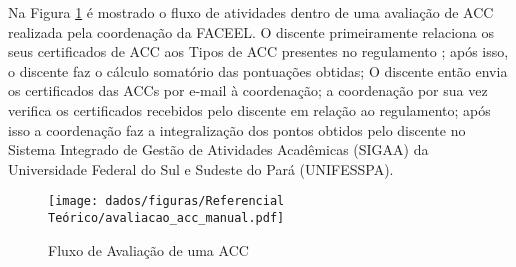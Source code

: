 Na Figura \ref{fig:fluxoAvaliacaoDeACC} é mostrado o fluxo de atividades dentro de uma avaliação de ACC realizada pela coordenação da FACEEL. O discente primeiramente relaciona os seus certificados de ACC aos Tipos de ACC presentes no regulamento \cite{faceel2014regulamento}; após isso, o discente faz o cálculo somatório das pontuações obtidas; O discente então envia os certificados das ACCs por e-mail à coordenação; a coordenação por sua vez verifica os certificados recebidos pelo discente em relação ao regulamento; após isso a coordenação faz a integralização dos pontos obtidos pelo discente no Sistema Integrado de Gestão de Atividades Acadêmicas (SIGAA) da Universidade Federal do Sul e Sudeste do Pará (UNIFESSPA).

\begin{figure}[H]
    \centering
    \texttt{[image: dados/figuras/Referencial Teórico/avaliacao\_acc\_manual.pdf]}
    \caption{Fluxo de Avaliação de uma ACC}
    \label{fig:fluxoAvaliacaoDeACC}
\end{figure}